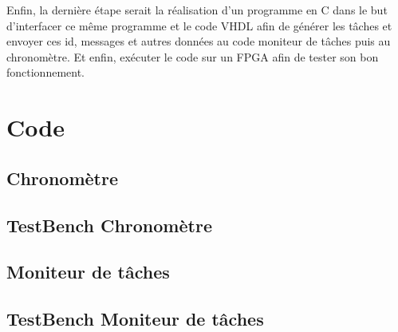 \documentclass[a4paper,12pt]{report}
\begin{document}
		Enfin, la dernière étape serait la réalisation d'un programme en C dans le but d'interfacer ce même programme et le code VHDL afin de générer les tâches et envoyer ces id, messages et autres données au code moniteur de tâches puis au chronomètre. Et enfin, exécuter le code sur un FPGA afin de tester son bon fonctionnement.
	
	
	\section{Code}
		\subsection{Chronomètre}
			
		
		\subsection{TestBench Chronomètre}
			
			
		\subsection{Moniteur de tâches}
			
		
		\subsection{TestBench Moniteur de tâches}
			
			
			
	\clearpage
\end{document}
